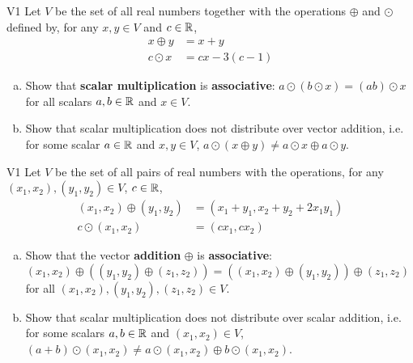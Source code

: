 \begin{problem}{V1}
Let \(V\) be the  set of all real numbers together with the operations \(\oplus\) and \(\odot\) defined by, for any \(x,y\in V\) and \(c\in \mathbb{R}\),
\begin{align*}
x\oplus y  &= x+y \\
c \odot x &= cx-3(c-1)
\end{align*}
\begin{enumerate}[(a)]
\item Show that \textbf{scalar multiplication} is
      \textbf{associative}: \(a\odot(b\odot x)=(ab)\odot x\) for all scalars \(a,b \in \mathbb{R}\) and \(x \in V\).
\item Show that scalar multiplication does not distribute over vector addition, i.e. for some scalar \(a \in \mathbb{R}\) and \(x,y\in V\), \(a \odot (x \oplus y) \neq a \odot x \oplus a \odot y\).
\end{enumerate}
\end{problem}


\begin{problem}{V1}
Let \(V\) be the set of all pairs of real numbers with the operations, for any \((x_1,x_2), (y_1,y_2) \in V\), \(c\in \mathbb{R}\),
\begin{align*}
(x_1,x_2) \oplus (y_1,y_2) &= (x_1+y_1,x_2+y_2+2x_1y_1) \\
c \odot (x_1,x_2) &= (cx_1, cx_2)
\end{align*}
\begin{enumerate}[(a)]
\item Show that the vector \textbf{addition} \(\oplus\) is \textbf{associative}:
      \((x_1,x_2) \oplus ((y_1,y_2) \oplus (z_1,z_2))=((x_1,x_2)\oplus (y_1,y_2))\oplus (z_1,z_2)\) for all \((x_1,x_2), (y_1,y_2), (z_1,z_2) \in V\).
\item Show that scalar multiplication does not distribute over scalar addition, i.e. for some scalars \(a,b \in \mathbb{R}\) and \((x_1,x_2) \in V\), \( (a+b) \odot (x_1,x_2) \neq a\odot (x_1,x_2) \oplus b \odot (x_1,x_2) \).
\end{enumerate}
\end{problem}



